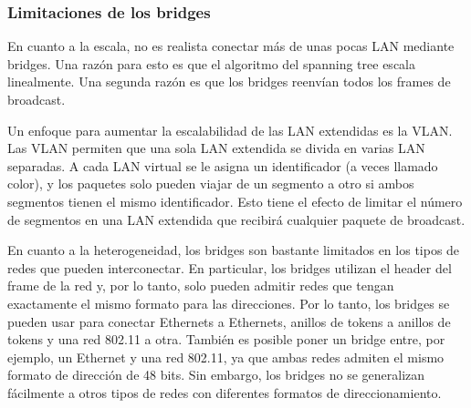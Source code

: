 \subsubsection{Limitaciones de los bridges}
En cuanto a la escala, no es realista conectar más de unas pocas LAN mediante bridges. Una razón para esto es que el algoritmo del spanning tree escala linealmente. Una segunda razón es que los bridges reenvían todos los frames de broadcast.

Un enfoque para aumentar la escalabilidad de las LAN extendidas es la VLAN. Las VLAN permiten que una sola LAN extendida se divida en varias LAN separadas. A cada LAN virtual se le asigna un identificador (a veces llamado color), y los paquetes solo pueden viajar de un segmento a otro si ambos segmentos tienen el mismo identificador. Esto tiene el efecto de limitar el número de segmentos en una LAN extendida que recibirá cualquier paquete de broadcast.

En cuanto a la heterogeneidad, los bridges son bastante limitados en los tipos de redes que pueden interconectar. En particular, los bridges utilizan el header del frame de la red y, por lo tanto, solo pueden admitir redes que tengan exactamente el mismo formato para las direcciones. Por lo tanto, los bridges se pueden usar para conectar Ethernets a Ethernets, anillos de tokens a anillos de tokens y una red 802.11 a otra. También es posible poner un bridge entre, por ejemplo, un Ethernet y una red 802.11, ya que ambas redes admiten el mismo formato de dirección de 48 bits. Sin embargo, los bridges no se generalizan fácilmente a otros tipos de redes con diferentes formatos de direccionamiento.